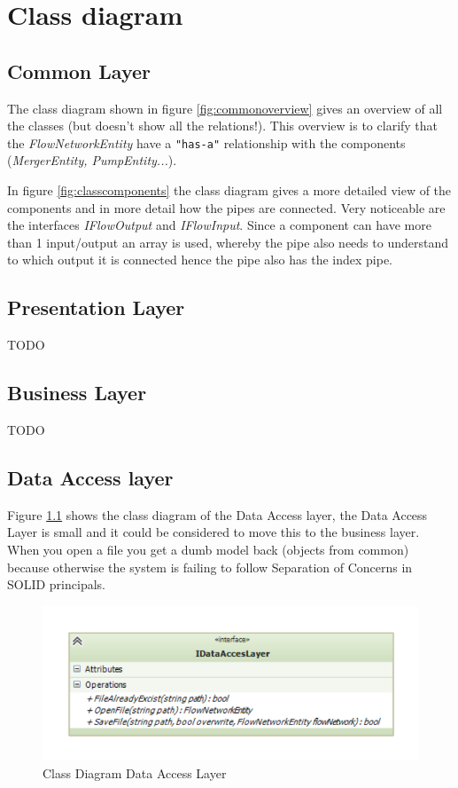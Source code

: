 \chapter{Class diagram}
\section{Common Layer}
The class diagram shown in figure \ref{fig:commonoverview} gives an overview of all the classes (but doesn't show all the relations!). This overview is to clarify that the \emph{FlowNetworkEntity} have a \texttt{"has-a"} relationship with the components (\emph{MergerEntity, PumpEntity...}).

In figure \ref{fig:classcomponents} the class diagram gives a more detailed view of the components and in more detail how the pipes are connected. Very noticeable are the interfaces \emph{IFlowOutput} and \emph{IFlowInput}. Since a component can have more than 1 input/output an array is used, whereby the pipe also needs to understand to which output it is connected hence the pipe also has the index pipe.

\section{Presentation Layer}
TODO

\section{Business Layer}
TODO

\section{Data Access layer}
Figure \ref{fig:dataaccess} shows the class diagram of the Data Access layer, the Data Access Layer is small and it could be considered to move this to the business layer. When you open a file you get a dumb model back (objects from common) because otherwise the system is failing to follow Separation of Concerns in SOLID principals.

\begin{figure}[h!]
	\centering
	\includegraphics{figures/ClassDataAccess.pdf}
	\caption{Class Diagram Data Access Layer}
	\label{fig:dataaccess}
\end{figure}

